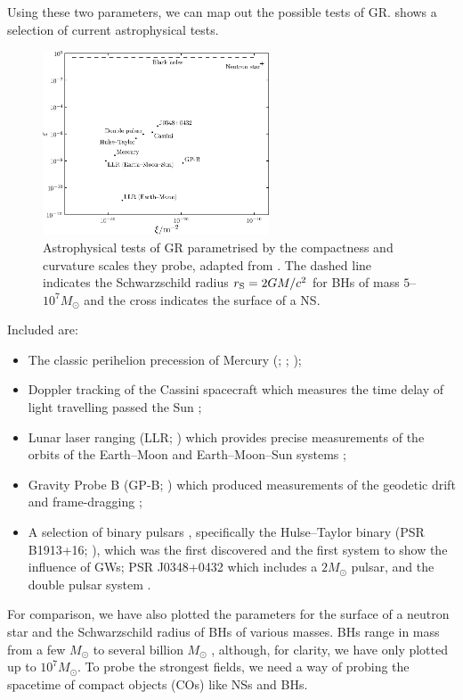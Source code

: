 Using these two parameters, we can map out the possible tests of GR.  shows a selection of current astrophysical tests.
\begin{figure}
  \begin{center}
  \includegraphics[width=0.6\textwidth]{./images/Fig_Psaltis_plot}
    \caption{Astrophysical tests of GR parametrised by the compactness and curvature scales they probe, adapted from \citet{Psaltis2008a}. The dashed line indicates the Schwarzschild radius $r_\mathrm{S} = 2 GM /c^2$ for BHs of mass $5$--$10^7M_\odot$ and the cross indicates the surface of a NS.}   
    \label{fig:Psaltis} 
  \end{center}
\end{figure}
Included are:
\begin{itemize}
\item The classic perihelion precession of Mercury (\citealt[section 10.2]{Hobson2006}; \citealt[section 7.3]{Will1993}; \citealt{Pitjeva2009a});
\item Doppler tracking of the Cassini spacecraft \citep{Bertotti2003} which measures the time delay of light travelling passed the Sun \citep[section 7.2]{Will1993};
\item Lunar laser ranging (LLR; \citealt{Bender1973,Williams2012}) which provides precise measurements of the orbits of the Earth--Moon and Earth--Moon--Sun systems \citep[section 8.1]{Will1993};
\item Gravity Probe B (GP-B; \citealt{Everitt2009,Everitt2011}) which produced measurements of the geodetic drift and frame-dragging \citep[section 9.1]{Will1993};
\item A selection of binary pulsars \citep{Taylor1993,Stairs2003}, specifically the Hulse--Taylor binary (PSR B1913+16; \citealt{Hulse1975,Weisberg2010}), which was the first discovered and the first system to show the influence of GWs; PSR J0348+0432 \citep{Antoniadis2013} which includes a $2 M_\odot$ pulsar, and the double pulsar system \citep{Breton2008,Kramer2008}. %
\end{itemize}
For comparison, we have also plotted the parameters for the surface of a neutron star and the Schwarzschild radius of BHs of various masses. BHs range in mass from a few $M_\odot$ \citep{Ozel2010} to several billion $M_\odot$ \citep{Hlavacek-Larrondo2012}, although, for clarity, we have only plotted up to $10^7 M_\odot$. To probe the strongest fields, we need a way of probing the spacetime of compact objects (COs) like NSs and BHs.

